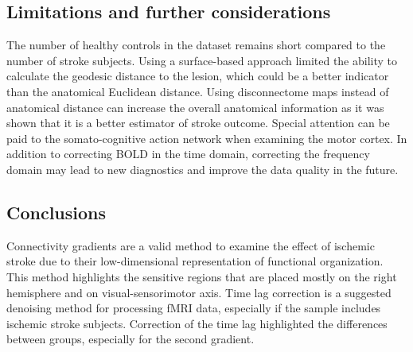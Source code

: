 \documentclass[fleqn,10pt]{wlscirep}
\begin{document}

   

\subsection*{Limitations and further considerations}
The number of healthy controls in the dataset remains short compared to the number of stroke subjects. Using a surface-based approach limited the ability to calculate the geodesic distance to the lesion, which could be a better indicator than the anatomical Euclidean distance. Using disconnectome maps instead of anatomical distance can increase the overall anatomical information as it was shown that it is a better estimator of stroke outcome. Special attention can be paid to the somato-cognitive action network when examining the motor cortex. In addition to correcting BOLD in the time domain, correcting the frequency domain may lead to new diagnostics and improve the data quality in the future. 

\subsection*{Conclusions}
Connectivity gradients are a valid method to examine the effect of ischemic stroke due to their low-dimensional representation of functional organization. This method highlights the sensitive regions that are placed mostly on the right hemisphere and on visual-sensorimotor axis. Time lag correction is a suggested denoising method for processing fMRI data, especially if the sample includes ischemic stroke subjects. Correction of the time lag highlighted the differences between groups, especially for the second gradient. 
\end{document}
